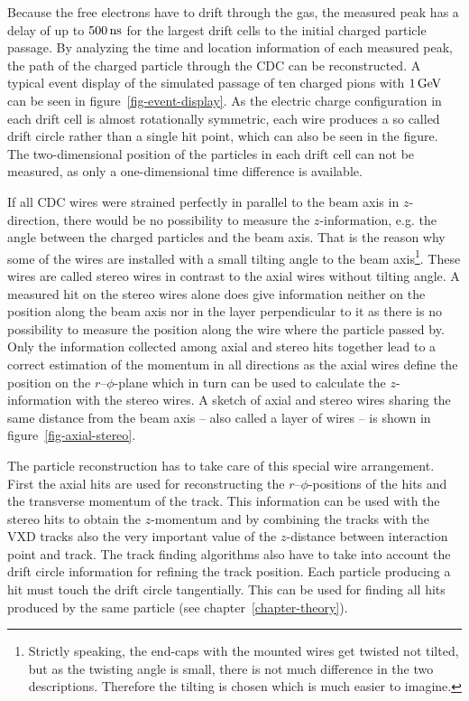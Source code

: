 Because the free electrons have to drift through the gas, the measured peak has a delay of up to $\unit[500]{ns}$ for the largest drift cells to the initial charged particle passage. By analyzing the time and location information of each measured peak, the path of the charged particle through the CDC can be reconstructed. A typical event display of the simulated passage of ten charged pions with $\unit[1]{GeV}$ can be seen in figure~\ref{fig-event-display}. As the electric charge configuration in each drift cell is almost rotationally symmetric, each wire produces a so called drift circle rather than a single hit point, which can also be seen in the figure. The two-dimensional position of the particles in each drift cell can not be measured, as only a one-dimensional time difference is available.

If all CDC wires were strained perfectly in parallel to the beam axis in $z$-direction, there would be no possibility to measure the $z$-information, e.g. the angle between the charged particles and the beam axis. That is the reason why some of the wires are installed with a small tilting angle to the beam axis\footnote{Strictly speaking, the end-caps with the mounted wires get twisted not tilted, but as the twisting angle is small, there is not much difference in the two descriptions. Therefore the tilting is chosen which is much easier to imagine.}. These wires are called stereo wires in contrast to the axial wires without tilting angle. A measured hit on the stereo wires alone does give information neither on the position along the beam axis nor in the layer perpendicular to it as there is no possibility to measure the position along the wire where the particle passed by. Only the information collected among axial and stereo hits together lead to a correct estimation of the momentum in all directions as the axial wires define the position on the $r$--$\phi$-plane which in turn can be used to calculate the $z$-information with the stereo wires. A sketch of axial and stereo wires sharing the same distance from the beam axis -- also called a layer of wires -- is shown in figure~\ref{fig-axial-stereo}. 

The particle reconstruction has to take care of this special wire arrangement. First the axial hits are used for reconstructing the $r$--$\phi$-positions of the hits and the transverse momentum of the track. This information can be used with the stereo hits to obtain the $z$-momentum and by combining the tracks with the VXD tracks also the very important value of the $z$-distance between interaction point and track. The track finding algorithms also have to take into account the drift circle information for refining the track position. Each particle producing a hit must touch the drift circle tangentially. This can be used for finding all hits produced by the same particle (see chapter~\ref{chapter-theory}).


